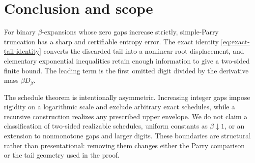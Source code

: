 \section{Conclusion and scope}

For binary $\beta$-expansions whose zero gaps increase strictly, simple-Parry truncation has a sharp and certifiable entropy error.  The exact identity \eqref{eq:exact-tail-identity} converts the discarded tail into a nonlinear root displacement, and elementary exponential inequalities retain enough information to give a two-sided finite bound.  The leading term is the first omitted digit divided by the derivative mass $\beta D_\beta$.

The schedule theorem is intentionally asymmetric.  Increasing integer gaps impose rigidity on a logarithmic scale and exclude arbitrary exact schedules, while a recursive construction realizes any prescribed upper envelope.  We do not claim a classification of two-sided realizable schedules, uniform constants as $\beta\downarrow1$, or an extension to nonmonotone gaps and larger digits.  These boundaries are structural rather than presentational: removing them changes either the Parry comparison or the tail geometry used in the proof.
